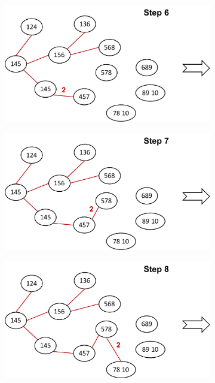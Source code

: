 \documentclass{article}
\begin{document}
\begin{figure}[h]
\begin{subfigure}[b]{0.315\textwidth}
  \end{subfigure}
  \hspace{0.1cm}
    \begin{subfigure}[b]{0.315\textwidth}
  	\centering
  	\includegraphics[width=\columnwidth]{3a8.pdf}
  \end{subfigure}
  \hspace{0.1cm}
  \begin{subfigure}[b]{0.315\textwidth}
    \centering
  	\includegraphics[width=\columnwidth]{3a9.pdf}
  \end{subfigure}
  \hspace{0.1cm}
  \begin{subfigure}[b]{0.315\textwidth}
    \centering
  	\includegraphics[width=\columnwidth]{3a10.pdf}

\end{subfigure}
\end{figure}
\end{document}
